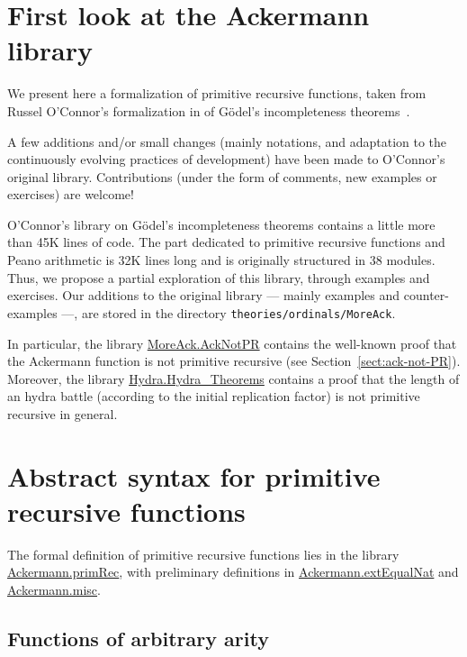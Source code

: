 \section{First look at the Ackermann library}

  We present here a formalization of  primitive recursive functions, taken from  Russel O'Connor's formalization in \coq{} of
G\"odel's incompleteness theorems~\cite{OConnor05}.

A few additions and/or small changes (mainly notations, and adaptation to the continuously evolving practices of \coq development) have been made to
O'Connor's original library. 
Contributions (under the form of comments, new examples or exercises) are welcome! 


O'Connor's library on Gödel's incompleteness theorems contains a little more 
than 45K lines of code. The part dedicated to primitive recursive functions and Peano arithmetic is 32K lines long and is originally structured in 38 modules.
Thus, we propose a partial exploration of this library, through examples and exercises. Our additions to the original library --- mainly examples and counter-examples ---,
are stored in the directory \texttt{theories/ordinals/MoreAck}.

In particular, the library \href{../theories/html/hydras.MoreAck.html}{MoreAck.AckNotPR} contains the well-known  proof that the Ackermann function is not primitive recursive (see Section~\vref{sect:ack-not-PR}).
Moreover, the library \href{../theories/html/hydras.Hydra_Theorems.html}{Hydra.Hydra\_Theorems} contains 
a proof that the length of an hydra battle (according to the initial replication factor) is not primitive recursive in general.

\section{Abstract syntax for primitive recursive functions}

The formal definition of primitive recursive functions lies in the library
\href{../theories/html/hydras.Ackermann.primRec.html}{Ackermann.primRec},
with preliminary definitions in 
\href{../theories/html/hydras.Ackermann.extEqualNat.html}{Ackermann.extEqualNat}
and
\href{../theories/html/hydras.Ackermann.misc.html}{Ackermann.misc}.

\subsection{Functions of arbitrary arity}

